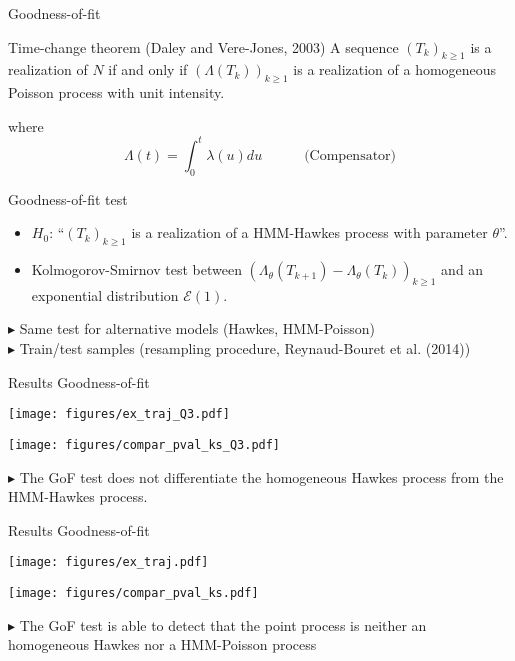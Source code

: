 \documentclass[french,english]{beamer}
\begin{document}
\begin{frame}{Goodness-of-fit}

\begin{block}{Time-change theorem (Daley and Vere-Jones, 2003)}
\small
 A sequence $(T_k)_{k\ge 1}$ is a realization of $N$ if and only if $(\Lambda(T_k))_{k \ge 1}$ is a realization of a homogeneous Poisson process with unit intensity.
\end{block}
where $$\Lambda(t)=\int_0^t \lambda(u) du \quad \quad \quad \textrm{(Compensator)}$$

\begin{block}{Goodness-of-fit test}
\begin{itemize}
\item $H_0$: ``$(T_k)_{k\ge 1}$ is a realization of a HMM-Hawkes process with parameter \(\theta\)''.
\item Kolmogorov-Smirnov test between $\left( \Lambda_\theta(T_{k+1}) - \Lambda_\theta(T_k) \right)_{k \ge 1}$ and an exponential distribution $\mathcal{E}(1)$.
\end{itemize}
\end{block}

$\blacktriangleright$ Same test for alternative models (Hawkes, HMM-Poisson)  \\
   $\blacktriangleright$ Train/test samples (resampling procedure, Reynaud-Bouret et al. (2014)) 
\end{frame}


\begin{frame}{Results Goodness-of-fit}

\begin{minipage}{4cm}
\centering
\texttt{[image: figures/ex\_traj\_Q3.pdf]}
\end{minipage}
\begin{minipage}{6cm}
\centering
    \texttt{[image: figures/compar\_pval\_ks\_Q3.pdf]}
\end{minipage}

\begin{block}
$\blacktriangleright$ The GoF test does not differentiate the homogeneous Hawkes process from the HMM-Hawkes process.
\end{block}
\end{frame}

\begin{frame}{Results Goodness-of-fit}

\begin{minipage}{4cm}
\centering
\texttt{[image: figures/ex\_traj.pdf]}
\end{minipage}
\begin{minipage}{6cm}
\centering
    \texttt{[image: figures/compar\_pval\_ks.pdf]}
\end{minipage}

\begin{block}
$\blacktriangleright$ The GoF test is able to detect that the point process is neither an homogeneous Hawkes nor a HMM-Poisson process
\end{block}
\end{frame}
\end{document}
